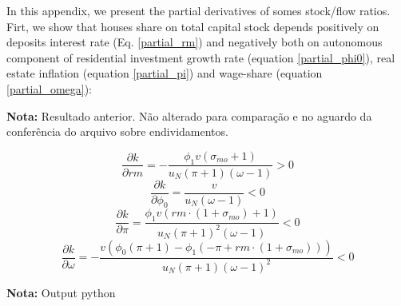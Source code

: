 \documentclass[11pt]{article}
\begin{document}
In this appendix, we present the partial derivatives of somes stock/flow ratios.
Firt, we show that houses share on total capital stock depends positively on deposits interest rate (Eq. \ref{partial_rm}) and negatively both on autonomous component of residential investment growth rate (equation \ref{partial_phi0}), real estate inflation (equation \ref{partial_pi}) and wage-share (equation \ref{partial_omega}):

\textbf{Nota:} Resultado anterior. Não alterado para comparação e no aguardo da conferência do arquivo sobre endividamentos.

\begin{equation}
\label{partial_rm}
\frac{\partial k}{\partial rm} = - \frac{\phi_{1} v \left(\sigma_{mo} + 1\right)}{u_N \left(\pi + 1\right) \left(\omega - 1\right)} > 0
\end{equation}
\begin{equation}
\label{partial_phi0}
\frac{\partial k}{\partial \phi_0} = \frac{v}{u_N \left(\omega - 1\right)} < 0
\end{equation}
\begin{equation}
\label{partial_pi}
\frac{\partial k}{\partial \pi} = \frac{\phi_{1} v \left(rm\cdot(1+\sigma_{mo}) + 1\right)}{u_N \left(\pi + 1\right)^{2} \left(\omega - 1\right)} < 0
\end{equation}
\begin{equation}
\label{partial_omega}
\frac{\partial k}{\partial \omega} = - \frac{v \left(\phi_{0} \left(\pi + 1\right) - \phi_{1} \left(- \pi + rm\cdot(1 + \sigma_{mo})\right)\right)}{u_N \left(\pi + 1\right) \left(\omega - 1\right)^{2}} < 0
\end{equation}


\textbf{Nota:} Output python
\end{document}
